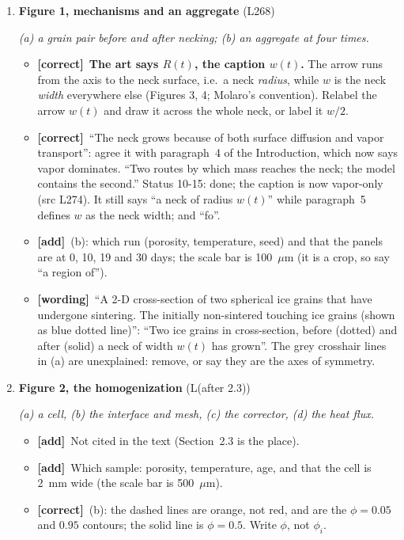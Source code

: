 \documentclass[11pt]{article}
\newcommand{\Pg}[3]{\item \textbf{#1} {\small(#2)}\par\textit{#3}}
\newcommand{\tC}{\textcolor{miss}{\textbf{[correct]}}\ }
\newcommand{\tG}{\textcolor{stale}{\textbf{[wording]}}\ }
\newcommand{\tA}{\textcolor{have}{\textbf{[add]}}\ }
\newcommand{\add}[1]{\textcolor{revX}{#1}}
\begin{document}
\begin{enumerate}
\Pg{Figure 1, mechanisms and an aggregate}{L268}{(a) a grain pair before and after necking; (b) an aggregate at four times.}
  \begin{itemize}
  \item \tC \textbf{The art says $R(t)$, the caption $w(t)$.} The arrow runs
    from the axis to the neck surface, i.e.\ a neck \emph{radius}, while $w$
    is the neck \emph{width} everywhere else (Figures 3, 4; Molaro's
    convention). Relabel the arrow $w(t)$ and draw it across the whole neck,
    or label it $w/2$.
  \item \tC ``The neck grows because of both surface diffusion and vapor
    transport'': agree it with paragraph~4 of the Introduction, which now
    says vapor dominates. ``Two routes by which mass reaches the neck; the
    model contains the second.''
    \add{Status 10-15: done; the caption is now vapor-only (src L274). It
    still says ``a neck of radius $w(t)$'' while paragraph~5 defines $w$ as
    the neck width; and ``fo''.}
  \item \tA (b): which run (porosity, temperature, seed) and that the panels
    are at 0, 10, 19 and 30 days; the scale bar is 100~$\mu$m (it is a
    crop, so say ``a region of'').
  \item \tG ``A 2-D cross-section of two spherical ice grains that have
    undergone sintering. The initially non-sintered touching ice grains
    (shown as blue dotted line)'': ``Two ice grains in cross-section, before
    (dotted) and after (solid) a neck of width $w(t)$ has grown''. The grey
    crosshair lines in (a) are unexplained: remove, or say they are the axes
    of symmetry.
  \end{itemize}
\Pg{Figure 2, the homogenization}{L(after 2.3)}{(a) a cell, (b) the interface and mesh, (c) the corrector, (d) the heat flux.}
  \begin{itemize}
  \item \tA Not cited in the text (Section~2.3 is the place).
  \item \tA Which sample: porosity, temperature, age, and that the cell is
    2~mm wide (the scale bar is 500~$\mu$m).
  \item \tC (b): the dashed lines are orange, not red, and are the
    $\phi = 0.05$ and $0.95$ contours; the solid line is $\phi = 0.5$.
    Write $\phi$, not $\phi_i$.

\end{itemize}
\end{enumerate}
\end{document}
